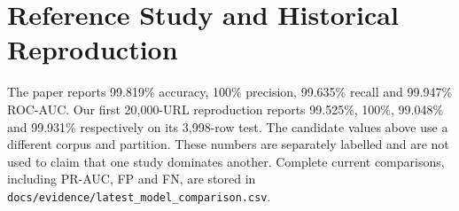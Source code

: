 \section{Reference Study and Historical Reproduction}
The paper reports 99.819\% accuracy, 100\% precision, 99.635\% recall and 99.947\% ROC-AUC. Our first 20,000-URL reproduction reports 99.525\%, 100\%, 99.048\% and 99.931\% respectively on its 3,998-row test. The candidate values above use a different corpus and partition. These numbers are separately labelled and are not used to claim that one study dominates another. Complete current comparisons, including PR-AUC, FP and FN, are stored in \texttt{docs/evidence/latest\_model\_comparison.csv}.